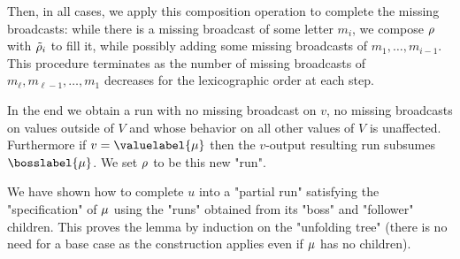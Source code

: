 Then, in all cases, we apply this composition operation to complete the missing broadcasts: while there is a missing broadcast of some letter $m_i$, we compose $\rho$ with $\Tilde{\rho}_i$ to fill it, while possibly adding some missing broadcasts of $m_1, \ldots, m_{i-1}$.
This procedure terminates as the number of missing broadcasts of $m_\ell, m_{\ell-1}, \ldots, m_1$ decreases for the lexicographic order at each step.

In the end we obtain a run with no missing broadcast on $v$, no missing broadcasts on values outside of $V$ and whose behavior on all other values of $V$ is unaffected. Furthermore if $v = \valuelabel{\node}$ then the $v$-output resulting run subsumes $\bosslabel{\node}$. We set $\rho$ to be this new "run".

We have shown how to complete $u$ into a "partial run" satisfying the "specification" of $\mu$ using the "runs" obtained from its "boss" and "follower" children. This proves the lemma by induction on the "unfolding tree" (there is no need for a base case as the construction applies even if $\mu$ has no children).